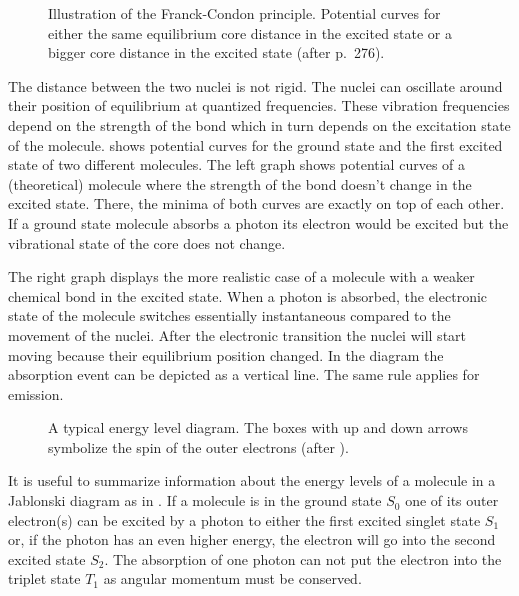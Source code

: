 \begin{figure}[!hbt]
  \centering
  
  \caption{Illustration of the Franck-Condon principle. Potential
    curves for either the same equilibrium core distance in the
    excited state or a bigger core distance in the excited state
    (after \cite{Haken2006} p.~276).}
  \label{fig:flu-condon}
\end{figure}

The distance between the two nuclei is not rigid. The nuclei can
oscillate around their position of equilibrium at quantized
frequencies. These vibration frequencies depend on the strength of the
bond which in turn depends on the excitation state of the
molecule.  shows potential curves for the
ground state and the first excited state of two different
molecules. The left graph shows potential curves of a (theoretical)
molecule where the strength of the bond doesn't change in the excited
state. There, the minima of both curves are exactly on top of each
other. If a ground state molecule absorbs a photon its electron would
be excited but the vibrational state of the core does not change.

The right graph displays the more realistic case of a molecule with a
weaker chemical bond in the excited state. When a photon is absorbed,
the electronic state of the molecule switches essentially
instantaneous compared to the movement of the nuclei. After the
electronic transition the nuclei will start moving because their
equilibrium position changed. In the diagram the absorption event can
be depicted as a vertical line. The same rule applies for emission.

\begin{figure}[!hbt]
  \centering
  \def\svgscale{.8}
  
  \caption{A typical energy level diagram. The boxes with up and down
    arrows symbolize the spin of the outer electrons (after
    \cite{Haken2006}).}
  \label{fig:flu-level}
\end{figure}

It is useful to summarize information about the energy levels of a
molecule in a Jablonski diagram as in . If a
molecule is in the ground state $S_0$ one of its outer electron(s) can
be excited by a photon to either the first excited singlet state $S_1$
or, if the photon has an even higher energy, the electron will go into
the second excited state $S_2$.  The absorption of one photon can not
put the electron into the triplet state $T_1$ as angular momentum must
be conserved.

